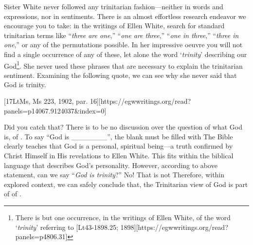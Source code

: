 Sister White never followed any trinitarian fashion—neither in words and expressions, nor in sentiments. There is an almost effortless research endeavor we encourage you to take: in the writings of Ellen White, search for standard trinitarian terms like “\textit{three are one},” “\textit{one are three},” “\textit{one in three},” “\textit{three in one},” or any of the permutations possible. In her impressive oeuvre you will not find a single occurrence of any of these, let alone the word ‘\textit{trinity}’ describing our God\footnote{There is but one occurrence, in the writings of Ellen White, of the word ‘\textit{trinity}’ referring to [Lt43-1898.25; 1898][https://egwwritings.org/read?panels=p4806.31]}. She never used these phrases that are necessary to explain the trinitarian sentiment. Examining the following quote, we can see why she never said that God is trinity.

[17LtMs, Ms 223, 1902, par. 16][https://egwwritings.org/read?panels=p14067.9124037&index=0]

Did you catch that? There is to be no discussion over the question of what God is,  of . To say “God is \_\_\_\_\_\_\_”, the blank must be filled with  The Bible clearly teaches that God is a personal, spiritual being—a truth confirmed by Christ Himself in His revelations to Ellen White. This fits within the biblical language that describes God’s personality. However, according to above statement, can we say “\textit{God is trinity}?” No! That is not  Therefore, within explored context, we can safely conclude that, the Trinitarian view of God is part of  of .

